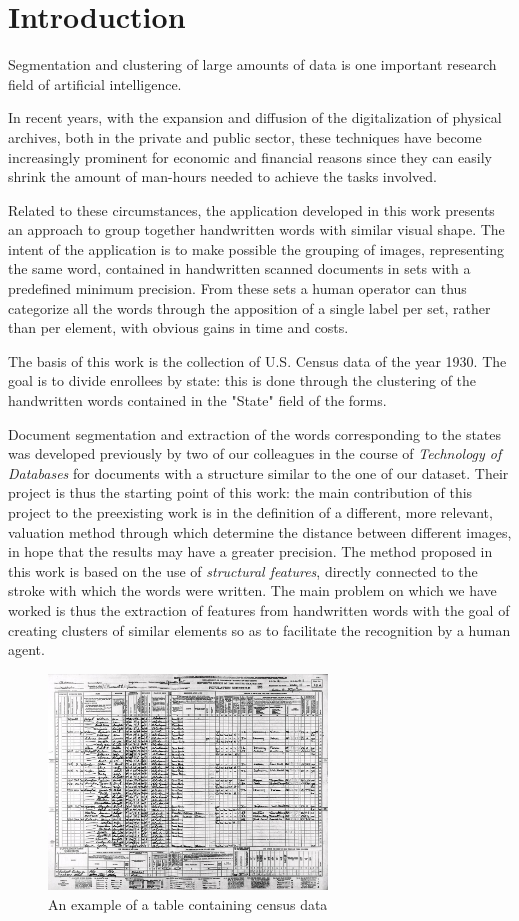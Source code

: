 \section{Introduction}
Segmentation and clustering of large amounts of data is one important research field of artificial intelligence.

In recent years, with the expansion and diffusion of the digitalization of physical archives, both in the private and public sector, these techniques have become increasingly prominent for economic and financial reasons since they can easily shrink the amount of man-hours needed to achieve the tasks involved. 

Related to these circumstances, the application developed in this work presents an approach to group together handwritten words with similar visual shape.
The intent of the application is to make possible the grouping of images, representing the same word, contained in handwritten scanned documents in sets with a predefined minimum precision.
From these sets a human operator can thus categorize all the words through the apposition of a single label per set, rather than per element, with obvious gains in time and costs.

  
The basis of this work is the collection of U.S. Census data of the year 1930.
The goal is to divide enrollees by state: this is done through the clustering of the handwritten words contained in the "State" field of the forms.

Document segmentation and extraction of the words corresponding to the states was developed previously by two of our colleagues in the course of \emph{Technology of Databases} for documents with a structure similar to the one of our dataset.
Their project is thus the starting point of this work: the main contribution of this project to the preexisting work is in the definition of a different, more relevant, valuation method through which determine the distance between different images, in hope that the results may have a greater precision.
The method proposed in this work is based on the use of \textit{structural features}, directly connected to the stroke with which the words were written. 
The main problem on which we have worked is thus the extraction of features from handwritten words with the goal of creating clusters of similar elements so as to facilitate the recognition by a human agent.

\begin{figure}[!ht]
\centering
\includegraphics[width=0.66\textwidth]{images/img1.jpg}
\caption{An example of a table containing census data}
\end{figure}